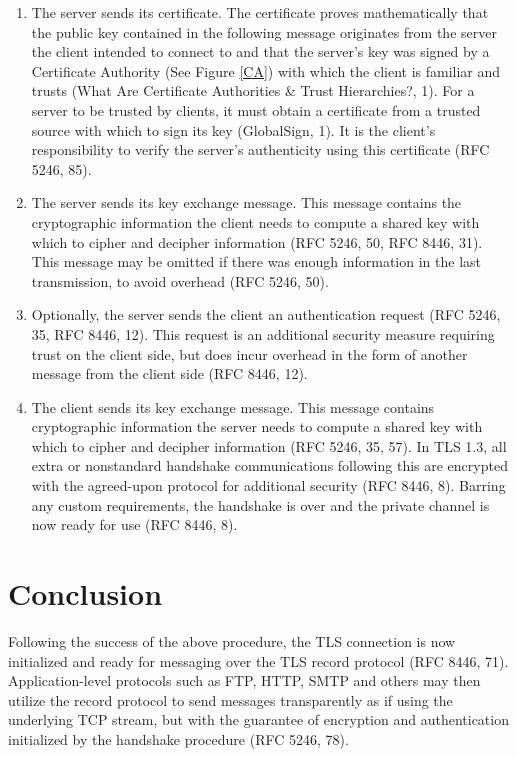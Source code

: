\documentclass[12pt]{article}
\begin{document}
\begin{enumerate}[rightmargin=1cm]
    \item The server sends its certificate. The certificate proves mathematically that the public key contained in the following message originates from the server the client intended to connect to and that the server’s key was signed by a Certificate Authority (See Figure \ref{CA}) with which the client is familiar and trusts (What Are Certificate Authorities \& Trust Hierarchies?, 1). For a server to be trusted by clients, it must obtain a certificate from a trusted source with which to sign its key (GlobalSign, 1). It is the client’s responsibility to verify the server’s authenticity using this certificate (RFC 5246, 85).
    \item The server sends its key exchange message. This message contains the cryptographic information the client needs to compute a shared key with which to cipher and decipher information (RFC 5246, 50, RFC 8446, 31). This message may be omitted if there was enough information in the last transmission, to avoid overhead (RFC 5246, 50).
    \item Optionally, the server sends the client an authentication request (RFC 5246, 35, RFC 8446, 12). This request is an additional security measure requiring trust on the client side, but does incur overhead in the form of another message from the client side (RFC 8446, 12).
    \item The client sends its key exchange message. This message contains cryptographic information the server needs to compute a shared key with which to cipher and decipher information (RFC 5246, 35, 57). In TLS 1.3, all extra or nonstandard handshake communications following this are encrypted with the agreed-upon protocol for additional security (RFC 8446, 8). Barring any custom requirements, the handshake is over and the private channel is now ready for use (RFC 8446, 8).
\end{enumerate}

\section{Conclusion}
Following the success of the above procedure, the TLS connection is now initialized and ready for messaging over the TLS record protocol (RFC 8446, 71). Application-level protocols such as FTP, HTTP, SMTP and others may then utilize the record protocol to send messages transparently as if using the underlying TCP stream, but with the guarantee of encryption and authentication initialized by the handshake procedure (RFC 5246, 78).
\end{document}
